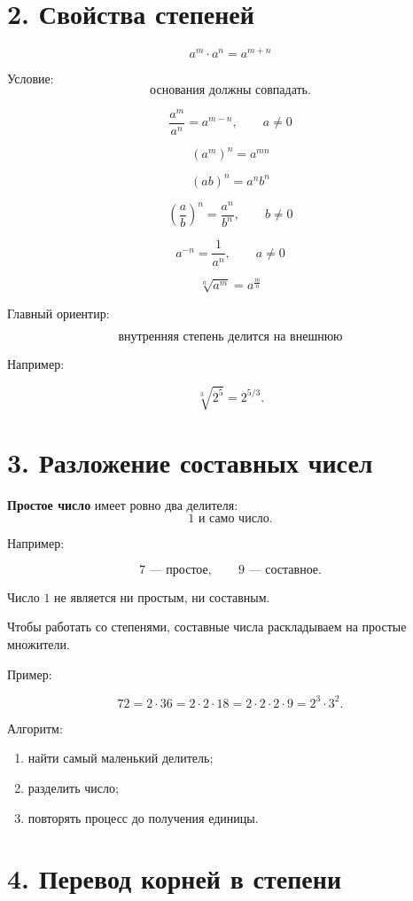 \documentclass[a4paper,12pt]{article}
\begin{document}
\section*{2. Свойства степеней}

\[
a^m\cdot a^n=a^{m+n}
\]

Условие:
\[
\text{основания должны совпадать}.
\]

\[
\frac{a^m}{a^n}=a^{m-n},
\qquad a\neq0
\]

\[
(a^m)^n=a^{mn}
\]

\[
(ab)^n=a^nb^n
\]

\[
\left(\frac ab\right)^n=\frac{a^n}{b^n},
\qquad b\neq0
\]

\[
a^{-n}=\frac1{a^n},
\qquad a\neq0
\]

\[
\sqrt[n]{a^m}=a^{\frac mn}
\]

Главный ориентир:

\[
\boxed{
\text{внутренняя степень делится на внешнюю}
}
\]

Например:

\[
\sqrt[3]{2^5}=2^{5/3}.
\]

\section*{3. Разложение составных чисел}

\textbf{Простое число} имеет ровно два делителя:
\[
1 \text{ и само число}.
\]

Например:

\[
7 \text{ --- простое},\qquad
9 \text{ --- составное}.
\]

Число $1$ не является ни простым, ни составным.

Чтобы работать со степенями, составные числа раскладываем на простые множители.

Пример:

\[
72=2\cdot36=2\cdot2\cdot18
=2\cdot2\cdot2\cdot9
=2^3\cdot3^2.
\]

Алгоритм:

\begin{enumerate}
\item найти самый маленький делитель;
\item разделить число;
\item повторять процесс до получения единицы.
\end{enumerate}

\section*{4. Перевод корней в степени}
\end{document}

